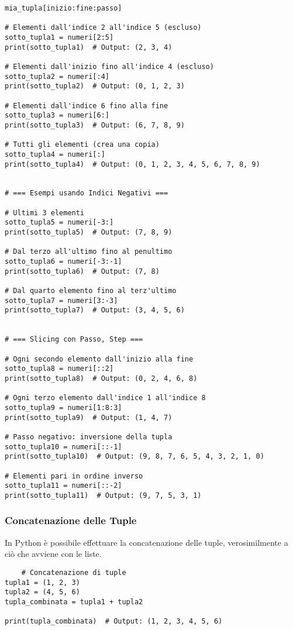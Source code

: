 \begin{lstlisting}
mia_tupla[inizio:fine:passo]

# Elementi dall'indice 2 all'indice 5 (escluso)
sotto_tupla1 = numeri[2:5]
print(sotto_tupla1)  # Output: (2, 3, 4)

# Elementi dall'inizio fino all'indice 4 (escluso)
sotto_tupla2 = numeri[:4]
print(sotto_tupla2)  # Output: (0, 1, 2, 3)

# Elementi dall'indice 6 fino alla fine
sotto_tupla3 = numeri[6:]
print(sotto_tupla3)  # Output: (6, 7, 8, 9)

# Tutti gli elementi (crea una copia)
sotto_tupla4 = numeri[:]
print(sotto_tupla4)  # Output: (0, 1, 2, 3, 4, 5, 6, 7, 8, 9)


# === Esempi usando Indici Negativi ===

# Ultimi 3 elementi
sotto_tupla5 = numeri[-3:]
print(sotto_tupla5)  # Output: (7, 8, 9)

# Dal terzo all'ultimo fino al penultimo
sotto_tupla6 = numeri[-3:-1]
print(sotto_tupla6)  # Output: (7, 8)

# Dal quarto elemento fino al terz'ultimo
sotto_tupla7 = numeri[3:-3]
print(sotto_tupla7)  # Output: (3, 4, 5, 6)


# === Slicing con Passo, Step ===

# Ogni secondo elemento dall'inizio alla fine
sotto_tupla8 = numeri[::2]
print(sotto_tupla8)  # Output: (0, 2, 4, 6, 8)

# Ogni terzo elemento dall'indice 1 all'indice 8
sotto_tupla9 = numeri[1:8:3]
print(sotto_tupla9)  # Output: (1, 4, 7)

# Passo negativo: inversione della tupla
sotto_tupla10 = numeri[::-1]
print(sotto_tupla10)  # Output: (9, 8, 7, 6, 5, 4, 3, 2, 1, 0)

# Elementi pari in ordine inverso
sotto_tupla11 = numeri[::-2]
print(sotto_tupla11)  # Output: (9, 7, 5, 3, 1)
\end{lstlisting}

\vspace{0,5cm}

\subsubsection{{Concatenazione delle Tuple}}\label{ConcatenazioneTuple}

In Python è possibile effettuare la concatenazione delle tuple, verosimilmente a ciò che avviene con le liste.


\begin{lstlisting}
    # Concatenazione di tuple
tupla1 = (1, 2, 3)
tupla2 = (4, 5, 6)
tupla_combinata = tupla1 + tupla2

print(tupla_combinata)  # Output: (1, 2, 3, 4, 5, 6)
\end{lstlisting}

